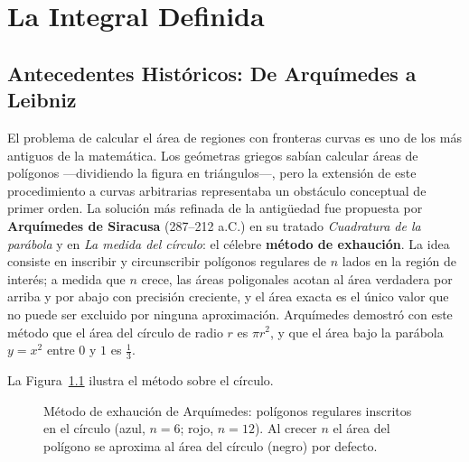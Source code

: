 \chapter{La Integral Definida}
\label{cap:intdefinida}

\section{Antecedentes Históricos: De Arquímedes a Leibniz}

El problema de calcular el área de regiones con fronteras curvas es uno de los más antiguos de la matemática. Los geómetras griegos sabían calcular áreas de polígonos ---dividiendo la figura en triángulos---, pero la extensión de este procedimiento a curvas arbitrarias representaba un obstáculo conceptual de primer orden. La solución más refinada de la antigüedad fue propuesta por \textbf{Arquímedes de Siracusa} (287--212 a.C.) en su tratado \emph{Cuadratura de la parábola} y en \emph{La medida del círculo}: el célebre \textbf{método de exhaución}. La idea consiste en inscribir y circunscribir polígonos regulares de $n$ lados en la región de interés; a medida que $n$ crece, las áreas poligonales acotan al área verdadera por arriba y por abajo con precisión creciente, y el área exacta es el único valor que no puede ser excluido por ninguna aproximación. Arquímedes demostró con este método que el área del círculo de radio $r$ es $\pi r^2$, y que el área bajo la parábola $y = x^2$ entre $0$ y $1$ es $\frac{1}{3}$.

La Figura~\ref{fig:exhaucion_circulo} ilustra el método sobre el círculo.

\begin{figure}[!htbp]
\centering
{}
\caption{Método de exhaución de Arquímedes: polígonos regulares inscritos en
el círculo (azul, $n=6$; rojo, $n=12$). Al crecer $n$ el área del polígono se
aproxima al área del círculo (negro) por defecto.}
\label{fig:exhaucion_circulo}
\end{figure}

